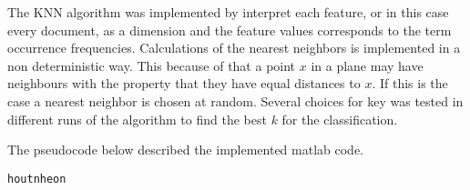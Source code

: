 The KNN algorithm was implemented by interpret each feature, or in this case
every document, as a dimension and the feature values corresponds to the term
occurrence frequencies. Calculations of the nearest neighbors is
implemented in a non deterministic way. This because of that a point $x$ in a plane
may have neighbours with the property that they have equal distances to
$x$. If this is the case a nearest neighbor is chosen at random. Several choices
for key was tested in different runs of the algorithm to find the best $k$ for
the classification.

The pseudocode below described the implemented matlab code.

\begin{verbatim}
houtnheon
\end{verbatim}
